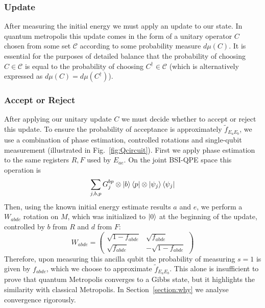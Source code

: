 \subsubsection{Update}
\label{section:update}
After measuring the initial energy we must apply an update to our state. In quantum metropolis this update comes in the form of a unitary operator $C$ chosen from some set $\mathcal{C}$ according to some probability measure $d\mu(C)$. It is essential for the purposes of detailed balance that the probability of choosing $C \in \mathcal{C}$ is equal to the probability of choosing $C^{\dagger} \in \mathcal{C}$ (which is alternatively expressed as $d\mu(C) = d\mu(C^{\dagger})$).
\subsubsection{Accept or Reject}
\label{section:acceptprob}
After applying our unitary update $C$ we must decide whether to accept or reject this update. To ensure the probability of acceptance is approximately $\tilde{f}_{E_aE_b}$, we use a combination of phase estimation, controlled rotations and single-qubit measurement (illustrated in Fig.~\ref{fig:Qcircuit}). First we apply phase estimation to the same registers $R, F$ used by $E_{ae}$. On the joint BSI-QPE space this operation is
\begin{equation}
  \sum_{j,b,p}G_j^{bp}\otimes\ket{b}\bra{p}\otimes\ket{\psi_j}\bra{\psi_j}
\end{equation}
Then, using the known initial energy estimate results $a$ and $e$, we perform a $W_{abde}$ rotation on $M$, which was initialized to $\ket{0}$ at the beginning of the update, controlled by $b$ from $R$ and $d$ from $F$:
\begin{equation}
    W_{abde} = \begin{pmatrix}
        \sqrt{1 - f_{abde}} & \sqrt{f_{abde}}\\
       \sqrt{f_{abde}} & -\sqrt{1 - f_{abde}}
    \end{pmatrix}
\end{equation}
Therefore, upon measuring this ancilla qubit the probability of measuring $s=1$ is given by $f_{abde}$, which we choose to approximate $\tilde f_{E_aE_b}$. This alone is insufficient to prove that quantum Metropolis converges to a Gibbs state, but it highlights the similarity with classical Metropolis. In Section~\ref{section:why} we analyse convergence rigorously.


